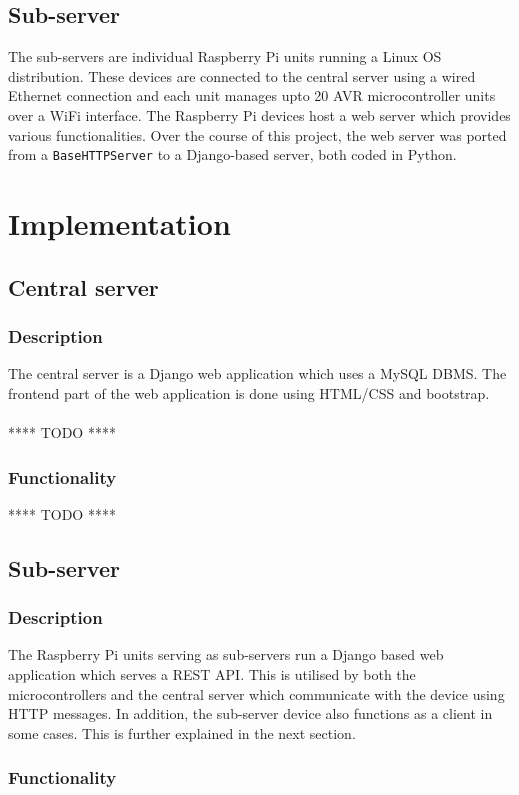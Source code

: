 \documentclass[letterpaper,11pt]{report}
\begin{document}
\section{Sub-server}
The sub-servers are individual Raspberry Pi units running a Linux OS distribution. These devices are connected to the central server using a wired Ethernet connection and each unit manages upto 20 AVR microcontroller units over a WiFi interface. The Raspberry Pi devices host a web server which provides various functionalities. Over the course of this project, the web server was ported from a \verb|BaseHTTPServer| to a Django-based server, both coded in Python.

\newpage
\chapter{Implementation}\label{chapter:Implementation}
\onehalfspacing
\section{Central server}
\subsection{Description}
The central server is a Django web application which uses a MySQL DBMS. The frontend part of the web application is done using HTML/CSS and bootstrap. \\ \\
{\huge{**** TODO ****}}
\subsection{Functionality}

{\huge{**** TODO ****}}
\section{Sub-server}
\subsection{Description}
The Raspberry Pi units serving as sub-servers run a Django based web application which serves a REST API. This is utilised by both the microcontrollers and the central server which communicate with the device using HTTP messages. In addition, the sub-server device also functions as a client in some cases. This is further explained in the next section.
\subsection{Functionality}
\end{document}
